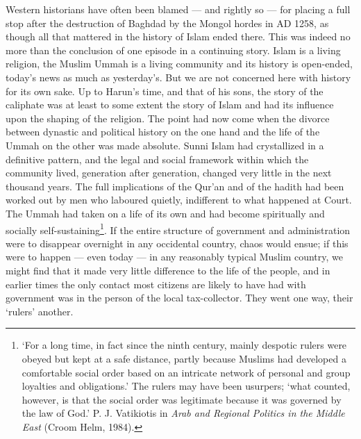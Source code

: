 \documentclass[10pt, twoside]{book}
\begin{document}
Western historians have often been blamed --- and rightly so --- for placing a full stop after the 
destruction of Baghdad by the Mongol hordes in AD 1258, as though all that mattered in the history of 
Islam ended there. This was indeed no more than the conclusion of one episode in a continuing story. 
Islam is a living religion, the Muslim Ummah is a living community and its history is open-ended, 
today's news as much as yesterday's. But we are not concerned here with history for its own sake. Up 
to Harun's time, and that of his sons, the story of the caliphate was at least to some extent the 
story of Islam and had its influence upon the shaping of the religion. The point had now come when 
the divorce between dynastic and political history on the one hand and the life of the Ummah on the 
other was made absolute. Sunni Islam had crystallized in a definitive pattern, and the legal and 
social framework within which the community lived, generation after generation, changed very little 
in the next thousand years. The full implications of the Qur'an and of the hadith had been worked out 
by men who laboured quietly, indifferent to what happened at Court. The Ummah had taken on a life of 
its own and had become spiritually and socially self\hyp{}sustaining\footnote{`For a long time, in fact since the ninth century, mainly despotic rulers were obeyed but kept at a safe distance, partly because Muslims had developed a comfortable social order based on an intricate network of personal and group loyalties and obligations.' The rulers may have been usurpers; `what counted, however, is that the social order was legitimate because it was governed by the law of God.' P. J. Vatikiotis in \emph{Arab and Regional Politics in the Middle East} (Croom Helm, 1984).}. If the entire structure of government and administration were to disappear overnight in any occidental country, chaos would ensue; if this were to happen --- even today --- in any reasonably typical Muslim country, we might find that it made very little difference to the life of the people, and in earlier times the only contact most citizens are likely to have had with government was in the person of the local tax\hyp{}collector. They went one way, their `rulers' another. \\
\end{document}
